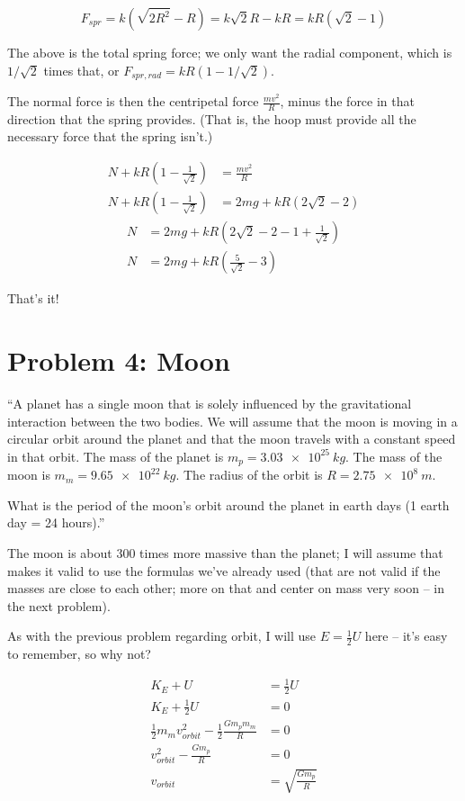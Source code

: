 \documentclass[12pt,a4paper]{report}
\begin{document}
\begin{equation}
F_{spr} = k (\sqrt{2 R^2} - R) = k \sqrt{2} R - k R = k R (\sqrt{2} - 1)
\end{equation}

The above is the total spring force; we only want the radial component, which is $1/\sqrt{2}$ times that, or $F_{spr,rad} = k R(1 - 1/\sqrt{2})$.

The normal force is then the centripetal force $\frac{m v^2}{R}$, minus the force in that direction that the spring provides. (That is, the hoop must provide all the necessary force that the spring isn't.)

\begin{align}
N + k R(1 - \frac{1}{\sqrt{2}}) &= \frac{m v^2}{R}\\
N + k R(1 - \frac{1}{\sqrt{2}}) &= 2 m g + k R(2\sqrt{2} - 2)
\end{align}
\begin{align}
N &= 2 m g + k R\left(2\sqrt{2} - 2 - 1 + \frac{1}{\sqrt{2}}\right)\\
N &= 2 m g + k R\left(\frac{5}{\sqrt{2}} - 3\right)
\end{align}

That's it!

\section{Problem 4: Moon}

``A planet has a single moon that is solely influenced by the gravitational interaction between the two bodies. We will assume that the moon is moving in a circular orbit around the planet and that the moon travels with a constant speed in that orbit. The mass of the planet is $m_p = \SI{3.03e25}{kg}$. The mass of the moon is $m_m = \SI{9.65e22}{kg}$. The radius of the orbit is $R = \SI{2.75e8}{m}$.

What is the period of the moon's orbit around the planet in earth days (1 earth day = 24 hours).''

The moon is about 300 times more massive than the planet; I will assume that makes it valid to use the formulas we've already used (that are not valid if the masses are close to each other; more on that and center on mass very soon -- in the next problem).

As with the previous problem regarding orbit, I will use $E = \frac{1}{2} U$ here -- it's easy to remember, so why not?

\begin{align}
K_E + U &= \frac{1}{2} U\\
K_E + \frac{1}{2} U &= 0\\
\frac{1}{2} m_m v_{orbit}^2 - \frac{1}{2} \frac{G m_p m_m}{R} &= 0\\
v_{orbit}^2 - \frac{G m_p}{R} &= 0\\
v_{orbit} &= \sqrt{\frac{G m_p}{R}}
\end{align}
\end{document}
